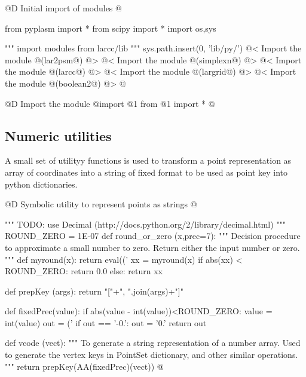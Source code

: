 \documentclass[11pt,oneside]{article}	%
\begin{document}
@D Initial import of modules
@{from pyplasm import *
from scipy import *
import os,sys

""" import modules from larcc/lib """
sys.path.insert(0, 'lib/py/')
@< Import the module @(lar2psm@) @>
@< Import the module @(simplexn@) @>
@< Import the module @(larcc@) @>
@< Import the module @(largrid@) @>
@< Import the module @(boolean2@) @>
@}

@D Import the module
@{import @1
from @1 import *
@}


\subsection{Numeric utilities}

A small set of utilityy functions is used to transform a point representation as array of coordinates into a string of fixed format to be used as point key into python dictionaries.

@D Symbolic utility to represent points as strings
@{""" TODO: 
use Decimal (http://docs.python.org/2/library/decimal.html) 
"""
ROUND_ZERO = 1E-07
def round_or_zero (x,prec=7):
	"""
	Decision procedure to approximate a small number to zero.
	Return either the input number or zero.
	"""
	def myround(x):
		return eval(('%
	xx = myround(x)
	if abs(xx) < ROUND_ZERO: return 0.0
	else: return xx

def prepKey (args): return "["+", ".join(args)+"]"

def fixedPrec(value):
	if abs(value - int(value))<ROUND_ZERO: value = int(value)
	out = ('%
	if out == '-0.': out = '0.'
	return out
	
def vcode (vect): 
	"""
	To generate a string representation of a number array.
	Used to generate the vertex keys in PointSet dictionary, and other 
	similar operations.
	"""
	return prepKey(AA(fixedPrec)(vect))
@}




\end{document}
